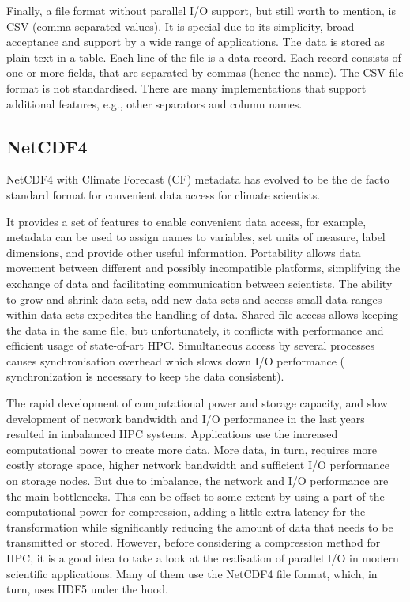 Finally, a file format without parallel I/O support, but still worth to mention, is CSV (comma-separated values).
It is special due to its simplicity, broad acceptance and support by a wide range of applications.
The data is stored as plain text in a table.
Each line of the file is a data record.
Each record consists of one or more fields, that are separated by commas (hence the name).
The CSV file format is not standardised.
There are many implementations that support additional features, e.g., other separators and column names.



\subsection{NetCDF4}

NetCDF4 with Climate Forecast (CF) metadata has evolved to be the de facto standard format for convenient data access for climate scientists.

It provides a set of features to enable convenient data access, for example, metadata can be used to assign names to variables, set units of measure, label dimensions, and provide other useful information.
Portability allows data movement between different and possibly incompatible platforms, simplifying the exchange of data and facilitating communication between scientists.
The ability to grow and shrink data sets, add new data sets and access small data ranges within data sets expedites the handling of data.
Shared file access allows keeping the data in the same file, but
unfortunately, it conflicts with performance and efficient usage of state-of-art HPC.
Simultaneous access by several processes causes synchronisation overhead which slows down I/O performance (
synchronization is necessary to keep the data consistent).

The rapid development of computational power and storage capacity, and slow development of network bandwidth and I/O performance in the last years resulted in imbalanced HPC systems.
Applications use the increased computational power to create more data.
More data, in turn, requires more costly storage space, higher network bandwidth and sufficient I/O performance on storage nodes.
But due to imbalance, the network and I/O performance are the main bottlenecks.
This can be offset to some extent by using a part of the computational power for compression, adding a little extra latency for the transformation while significantly reducing the amount of data that needs to be transmitted or stored.
However, before considering a compression method for HPC, it is a good idea to take a look at the realisation of parallel I/O in modern scientific applications.
Many of them use the NetCDF4 file format, which, in turn, uses HDF5 under the hood.

